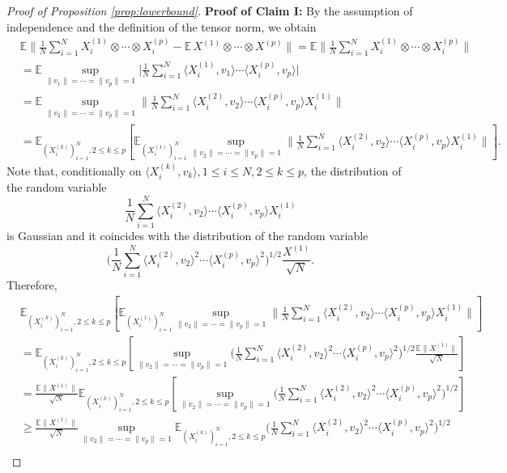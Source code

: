 \documentclass[10pt,a4paper]{amsart}
\newcommand{\E}{\mathbb{E}}
\begin{document}
\begin{proof}[Proof of Proposition \ref{prop:lowerbound}]
\textbf{Proof of Claim I:}
By the assumption of independence and the definition of the tensor norm, we obtain
\begin{align*}
&\E \bigg\|\frac{1}{N} \sum_{i=1}^N X_i^{(1)} \otimes \cdots \otimes X_i^{(p)}-\E\, X^{(1)} \otimes \cdots \otimes X^{(p)}\bigg\|=\E \bigg\|\frac{1}{N} \sum_{i=1}^N X_i^{(1)} \otimes \cdots \otimes X_i^{(p)}\bigg\| \\
&= \E \sup_{\|v_1\|= \cdots =\|v_p\|=1} \bigg| \frac{1}{N}\sum_{i=1}^N \langle X^{(1)}_i,v_1\rangle \cdots \langle X^{(p)}_i, v_p \rangle \bigg|\\
&= \E \sup_{\|v_2\|= \cdots =\|v_p\|=1}\bigg\| \frac{1}{N}\sum_{i=1}^N \langle X^{(2)}_i,v_2\rangle \cdots \langle X^{(p)}_i, v_p \rangle X_i^{(1)} \bigg\|\\
&=\E_{(X^{(k)}_i)_{i=1}^{N}, 2\le k\le p} \left[ \E_{(X^{(1)}_i)_{i=1}^{N}}  \sup_{\|v_2\|= \cdots =\|v_p\|=1}\bigg\| \frac{1}{N}\sum_{i=1}^N \langle X^{(2)}_i,v_2\rangle \cdots \langle X^{(p)}_i, v_p \rangle X_i^{(1)} \bigg\|\right].
\end{align*}
Note that, conditionally on $\langle X^{(k)}_i, v_k \rangle, 1\le i\le  N, 2\le k\le p$, the distribution of the random variable
\[
\frac{1}{N}\sum_{i=1}^N \langle X^{(2)}_i,v_2\rangle \cdots \langle X^{(p)}_i, v_p \rangle X_i^{(1)}
\]
is Gaussian and it coincides with the distribution of the random variable
\[
\bigg(\frac{1}{N} \sum_{i=1}^{N}\langle X^{(2)}_i, v_2\rangle^{2}\cdots \langle X^{(p)}_i, v_p\rangle^{2} \bigg)^{1 / 2} \frac{X^{(1)}}{\sqrt{N}}.
\]
Therefore,
\begin{align*}
    &\E_{(X^{(k)}_i)_{i=1}^{N}, 2\le k\le p} \left[ \E_{(X^{(1)}_i)_{i=1}^{N}}  \sup_{\|v_2\|= \cdots =\|v_p\|=1}\bigg\| \frac{1}{N}\sum_{i=1}^N \langle X^{(2)}_i,v_2\rangle \cdots \langle X^{(p)}_i, v_p \rangle X_i^{(1)} \bigg\|\right]\\
    &=\E_{(X^{(k)}_i)_{i=1}^{N}, 2\le k\le p} \left[ \sup_{\|v_2\|= \cdots =\|v_p\|=1}\bigg(\frac{1}{N} \sum_{i=1}^{N}\langle X^{(2)}_i, v_2\rangle^{2}\cdots \langle X^{(p)}_i, v_p\rangle^{2} \bigg)^{1 / 2} \frac{\E \|X^{(1)}\|}{\sqrt{N}}\right]\\
    &=\frac{\E \|X^{(1)}\|}{\sqrt{N}}\E_{(X^{(k)}_i)_{i=1}^{N}, 2\le k\le p}\left[ \sup_{\|v_2\|= \cdots =\|v_p\|=1}\bigg(\frac{1}{N} \sum_{i=1}^{N}\langle X^{(2)}_i, v_2\rangle^{2}\cdots \langle X^{(p)}_i, v_p\rangle^{2} \bigg)^{1 / 2} \right]\\
    &\ge \frac{\E \|X^{(1)}\|}{\sqrt{N}} \sup_{\|v_2\|= \cdots =\|v_p\|=1}\E_{(X^{(k)}_i)_{i=1}^{N}, 2\le k\le p}\bigg(\frac{1}{N} \sum_{i=1}^{N}\langle X^{(2)}_i, v_2\rangle^{2}\cdots \langle X^{(p)}_i, v_p\rangle^{2} \bigg)^{1 / 2}\\

\end{align*}
\end{proof}
\end{document}
